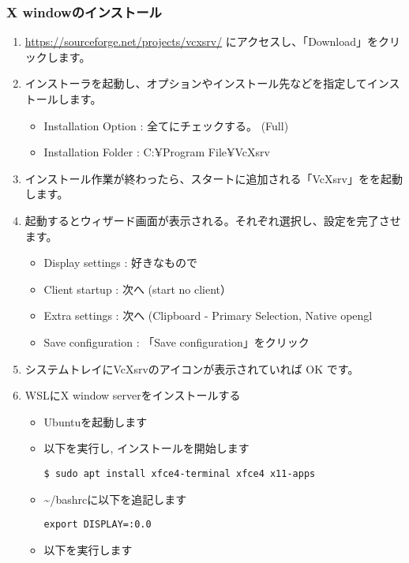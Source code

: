 \subsubsection{X windowのインストール}
\begin{enumerate}
    \item \url{https://sourceforge.net/projects/vcxsrv/} にアクセスし、「Download」をクリックします。
    \item インストーラを起動し、オプションやインストール先などを指定してインストールします。
        \begin{itemize}
            \item Installation Option : 全てにチェックする。 (Full)
            \item Installation Folder : C:¥Program File¥VcXsrv
        \end{itemize}
    \item インストール作業が終わったら、スタートに追加される「VcXsrv」をを起動します。
    \item 起動するとウィザード画面が表示される。それぞれ選択し、設定を完了させます。
        \begin{itemize}
            \item Display settings : 好きなもので
            \item Client startup : 次へ (start no client）
            \item Extra settings : 次へ (Clipboard - Primary Selection, Native opengl
            \item Save configuration : 「Save configuration」をクリック
        \end{itemize}
    \item システムトレイにVcXsrvのアイコンが表示されていれば OK です。
    \item WSLにX window serverをインストールする
        \begin{itemize}
            \item Ubuntuを起動します
            \item 以下を実行し, インストールを開始します
                \begin{lstlisting}
$ sudo apt install xfce4-terminal xfce4 x11-apps
                \end{lstlisting}
            \item \textasciitilde/bashrcに以下を追記します
                \begin{lstlisting}
export DISPLAY=:0.0
                \end{lstlisting}
            \item 以下を実行します

\end{itemize}
\end{enumerate}
